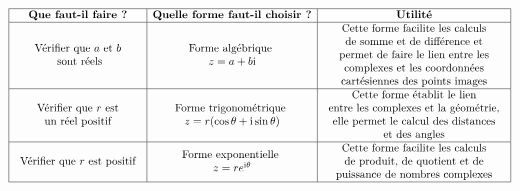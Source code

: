 \[
\begin{array}{|c|c|c|}
\hline
\textbf{Que faut-il faire ?} & \textbf{Quelle forme faut-il choisir ?} & \textbf{Utilité} \\
\hline
\begin{array}{c}
\text{Vérifier que } a \text{ et } b \\
\text{ sont réels}
\end{array}
&
\begin{array}{c}
\text{Forme algébrique } \\
z = a + b\text{i}
\end{array}
&
\begin{array}{c}
\text{Cette forme facilite les calculs} \\
\text{de somme et de différence et} \\
\text{permet de faire le lien entre les} \\
\text{complexes et les coordonnées} \\
\text{cartésiennes des points images}
\end{array}
\\
\hline
\begin{array}{c}
\text{Vérifier que } r \text{ est} \\
\text{un réel positif}
\end{array}
&
\begin{array}{c}
\text{Forme trigonométrique } \\
z = r(\cos\theta + \text{i}\sin\theta)
\end{array}
&
\begin{array}{c}
\text{Cette forme établit le lien} \\
\text{entre les complexes et la géométrie,} \\
\text{elle permet le calcul des distances} \\
\text{et des angles}
\end{array}
\\
\hline
\begin{array}{c}
\text{Vérifier que } r \text{ est positif}
\end{array}
&
\begin{array}{c}
\text{Forme exponentielle } \\
z = re^{\text{i}\theta}
\end{array}
&
\begin{array}{c}
\text{Cette forme facilite les calculs} \\
\text{de produit, de quotient et de} \\
\text{puissance de nombres complexes}
\end{array}
\\
\hline
\end{array}
\]

